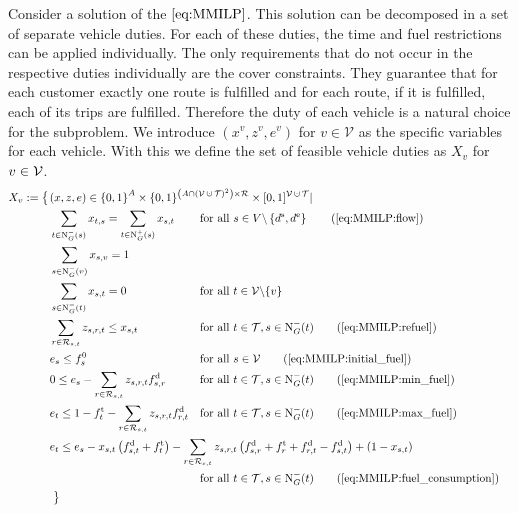Consider a solution of the $\eqref{eq:MMILP}$. This solution can be decomposed in a set of separate vehicle duties. For each of these duties, the time and fuel restrictions can be applied individually. The only requirements that do not occur in the respective duties individually are the cover constraints. They guarantee that for each customer exactly one route is fulfilled and for each route, if it is fulfilled, each of its trips are fulfilled. Therefore the duty of each vehicle is a natural choice for the subproblem. We introduce $\left(x^v,z^v,e^v\right)$ for $v\in\mathcal{V}$ as the specific variables for each vehicle. With this we define the set of feasible vehicle duties as $X_v$ for $v\in\mathcal{V}$.
\begin{align}
	X_v := \left\{\vphantom{\{0,1\}^A}\right. & \omit\rlap{$\displaystyle{(x,z,e)\in\left\{0,1\right\}^A \times \{0,1\}^{\left(A\cap\left(\mathcal{V}\cupdot\mathcal{T}\right)^2\right)\times\mathcal{R}} \times [0,1]^{\mathcal{V}\cupdot\mathcal{T}}|}$} \nonumber \\
	& \sum_{t\in\Nin(s)} x_{t,s} = \sum_{t\in\Nout(s)} x_{s,t} && \text{for all } s\in V\backslash\left\{d^{\operatorname{s}},d^{\operatorname{e}}\right\} \tag{\ref{eq:MMILP:flow}} \\
	& \sum_{s\in\Nin(v)} x_{s,v} = 1 \label{eq:Xv:vehicle} \\
	& \sum_{s\in\Nin(t)} x_{s,t} = 0 && \text{for all } t\in\mathcal{V}\backslash\{v\} \label{eq:Xv:other_vehicles} \\
	& \sum_{r\in\Rst} z_{s,r,t} \leq x_{s,t} & & \text{for all } t\in\mathcal{T}, s\in\Nin(t) \tag{\ref{eq:MMILP:refuel}} \\
	& e_s \leq f_s^0 & & \text{for all } s\in\mathcal{V} \tag{\ref{eq:MMILP:initial_fuel}} \\
	& 0 \leq e_s - \sum_{r\in\Rst} z_{s,r,t}\fd_{s,r} & & \text{for all } t\in\mathcal{T}, s\in\Nin(t) \tag{\ref{eq:MMILP:min_fuel}} \\
	& e_t \leq 1 - \ft_t - \sum_{r\in\Rst} z_{s,r,t}\fd_{r,t} & & \text{for all } t\in\mathcal{T}, s\in\Nin(t) \tag{\ref{eq:MMILP:max_fuel}} \\
	& \omit\rlap{$\displaystyle{e_t \leq e_s - x_{s,t}\left(f_{s,t}^{\operatorname{d}}+f_t^{\operatorname{t}}\right) - \sum_{r\in\Rst} z_{s,r,t}\left(\fd_{s,r}+\ft_r+\fd_{r,t}-\fd_{s,t}\right) + \left(1-x_{s,t}\right)}$} \nonumber \\
	& & & \text{for all } t\in\mathcal{T}, s\in\Nin(t) \tag{\ref{eq:MMILP:fuel_consumption}} \\
	& \left. \vphantom{\{0,1\}^A} \right\} \nonumber
\end{align}

